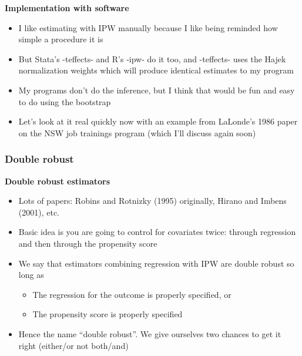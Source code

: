 \documentclass[notes=show]{beamer}
\begin{document}
\begin{frame}[plain]
\begin{center}
\textbf{Implementation with software}
\end{center}

\begin{itemize}
\item I like estimating with IPW manually because I like being reminded how simple a procedure it is
\item But Stata's -teffects- and R's -ipw- do it too, and -teffects- uses the Hajek normalization weights which will produce identical estimates to my program
\item My programs don't do the inference, but I think that would be fun and easy to do using the bootstrap
\item Let's look at it real quickly now with an example from LaLonde's 1986 paper on the NSW job trainings program (which I'll discuss again soon)
\end{itemize}

\end{frame}

\subsubsection{Double robust}
\begin{frame}[plain]
\begin{center}
\textbf{Double robust estimators}
\end{center}

\begin{itemize}
\item Lots of papers: Robins and Rotnizky (1995) originally, Hirano and Imbens (2001), etc.
\item Basic idea is you are going to control for covariates twice: through regression and then through the propensity score
\item We say that estimators combining regression with IPW are double robust so long as
	\begin{itemize}
	\item The regression for the outcome is properly specified, or
	\item The propensity score is properly specified
	\end{itemize}
\item Hence the name ``double robust''. We give ourselves two chances to get it right (either/or not both/and)
\end{itemize}

\end{frame}
\end{document}
